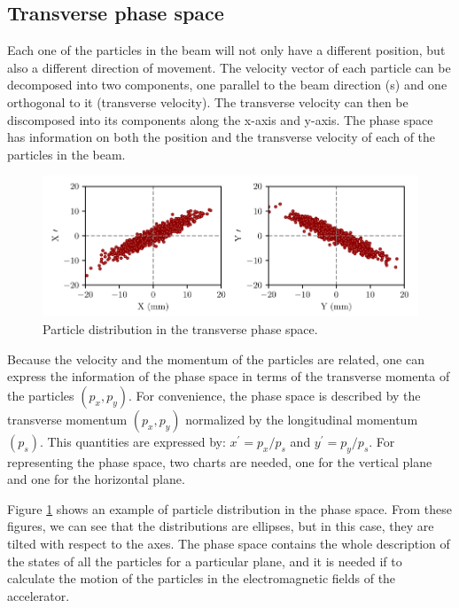 \subsection{Transverse phase space}
\label{subsec:TransPhSp}

Each one of the particles in the beam will not only have a different position, but also a different direction of movement. The velocity vector of each particle can be decomposed into two components, one parallel to the beam direction (s) and one orthogonal to it (transverse velocity). The transverse velocity can then be discomposed into its components along the x-axis and y-axis. The phase space has information on both the position and the transverse velocity of each of the particles in the beam. 

\begin{figure}[h!]
    \centering
    \includegraphics[width=1.0\columnwidth]{Figure_PhaseSpaceDist/PhaseSpaceDist.pdf}
    \caption{Particle distribution in the transverse phase space. }
    \label{fig:PhaseSpace}
\end{figure}

Because the velocity and the momentum of the particles are related, one can express the information of the phase space in terms of the transverse momenta of the particles $\left(p_x , p_y \right)$. For convenience, the phase space is described by the transverse momentum $(p_x , p_y)$ normalized by the longitudinal momentum $(p_s)$. This quantities are expressed by: $x^{'} = p_x / p_s$ and $y^{'} = p_y / p_s$. For representing the phase space, two charts are needed, one for the vertical plane and one for the horizontal plane.

Figure \ref{fig:PhaseSpace} shows an example of particle distribution in the phase space. From these figures, we can see that the distributions are ellipses, but in this case, they are tilted with respect to the axes. The phase space contains the whole description of the states of all the particles for a particular plane, and it is needed if to calculate the motion of the particles in the electromagnetic fields of the accelerator. 

